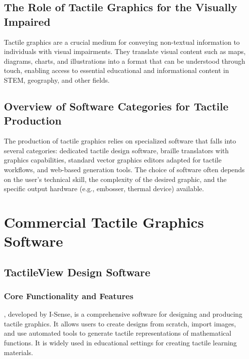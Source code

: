 \subsection{The Role of Tactile Graphics for the Visually Impaired}\label{ch14:ssec:role-of-tactile-graphics}
Tactile graphics are a crucial medium for conveying non-textual information to individuals with visual impairments. They translate visual content such as maps, diagrams, charts, and illustrations into a format that can be understood through touch, enabling access to essential educational and informational content in STEM, geography, and other fields.

\subsection{Overview of Software Categories for Tactile Production}\label{ch14:ssec:software-categories}
The production of tactile graphics relies on specialized software that falls into several categories: dedicated tactile design software, braille translators with graphics capabilities, standard vector graphics editors adapted for tactile workflows, and web-based generation tools. The choice of software often depends on the user's technical skill, the complexity of the desired graphic, and the specific output hardware (e.g., embosser, thermal device) available.

\section{Commercial Tactile Graphics Software}\label{ch14:sec:commercial-software}
\subsection{TactileView Design Software}\label{ch14:ssec:tactileview}
\subsubsection{Core Functionality and Features}\label{ch14:sssec:tactileview-features}
, developed by I-Sense, is a comprehensive software for designing and producing tactile graphics. It allows users to create designs from scratch, import images, and use automated tools to generate tactile representations of mathematical functions. It is widely used in educational settings for creating tactile learning materials.

